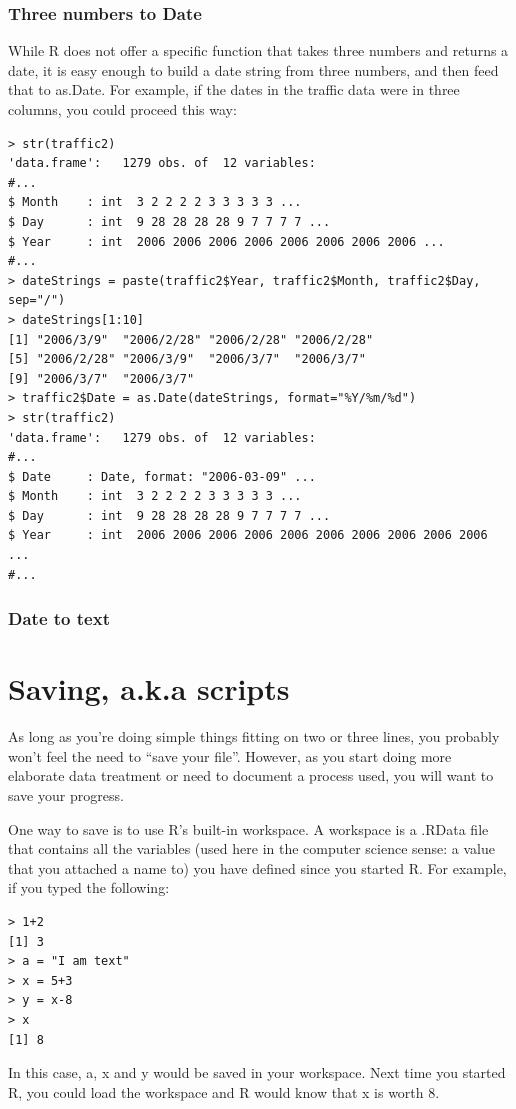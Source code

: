 \documentclass{report}
\newcommand{\code}[1]{\textsf{\ttfamily #1}}
\begin{document}
			\subsubsection{Three numbers to \code{Date}}
			While R does not offer a specific function that takes three numbers and returns a date, it is easy enough to build a date string from three numbers, and then feed that to \code{as.Date}. For example, if the dates in the traffic data were in three columns, you could proceed this way:
			
			\begin{verbatim}
> str(traffic2)
'data.frame':   1279 obs. of  12 variables:
#...
$ Month    : int  3 2 2 2 2 3 3 3 3 3 ...
$ Day      : int  9 28 28 28 28 9 7 7 7 7 ...
$ Year     : int  2006 2006 2006 2006 2006 2006 2006 2006 ...
#...
> dateStrings = paste(traffic2$Year, traffic2$Month, traffic2$Day, sep="/")
> dateStrings[1:10]
[1] "2006/3/9"  "2006/2/28" "2006/2/28" "2006/2/28"
[5] "2006/2/28" "2006/3/9"  "2006/3/7"  "2006/3/7" 
[9] "2006/3/7"  "2006/3/7" 
> traffic2$Date = as.Date(dateStrings, format="%Y/%m/%d")
> str(traffic2)
'data.frame':   1279 obs. of  12 variables:
#...
$ Date     : Date, format: "2006-03-09" ...
$ Month    : int  3 2 2 2 2 3 3 3 3 3 ...
$ Day      : int  9 28 28 28 28 9 7 7 7 7 ...
$ Year     : int  2006 2006 2006 2006 2006 2006 2006 2006 2006 2006 ...
#...
			\end{verbatim}
			
			\subsubsection{\code{Date} to text}
	
	\section{Saving, a.k.a scripts}
	As long as you're doing simple things fitting on two or three lines, you probably won't feel the need to ``save your file''. However, as you start doing more elaborate data treatment or need to document a process used, you will want to save your progress.
	
	One way to save is to use R's built-in \code{workspace}. A \code{workspace} is a \code{.RData} file that contains all the variables (used here in the computer science sense: a value that you attached a name to) you have defined since you started R. For example, if you typed the following:
	\begin{verbatim}
> 1+2
[1] 3
> a = "I am text"
> x = 5+3
> y = x-8
> x
[1] 8
	\end{verbatim}
	In this case, \code{a}, \code{x} and \code{y} would be saved in your workspace. Next time you started R, you could load the \code{workspace} and R would know that x is worth 8.
	
\end{document}
